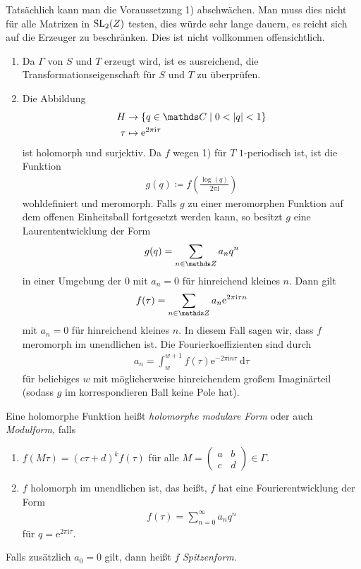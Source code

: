 Tatsächlich kann man die Voraussetzung 1) abschwächen.
Man muss dies nicht für alle Matrizen in $\operatorname{SL}_2(Z)$ testen,
dies würde sehr lange dauern, es reicht sich auf die Erzeuger zu beschränken.
Dies ist nicht vollkommen offensichtlich.
\begin{bem}
\begin{enumerate}[label=\arabic*)]
\item Da $\Gamma$ von $S$ und $T$ erzeugt wird, ist es ausreichend,
die Transformationseigenschaft für $S$ und $T$ zu überprüfen.
\item Die Abbildung
\begin{align*}
H&\to \{q \in \C \mid 0<\abs{q}<1\}\\
\tau &\mapsto \mathrm{e}^{2 \pi \mathrm{i}\tau}
\end{align*}
ist holomorph und surjektiv.
Da $f$ wegen 1) für $T$ $1$-periodisch ist, ist die Funktion
\begin{align*}
g(q)\coloneqq f\left( \frac{\log(q)}{2 \pi \mathrm{i}} \right)
\end{align*}
wohldefiniert und meromorph.
Falls $g$ zu einer meromorphen Funktion auf dem offenen Einheitsball fortgesetzt werden kann,
so besitzt $g$ eine Laurententwicklung der Form
\begin{align*}
g(q)=\sum_{n\in \Z} a_nq^n
\end{align*}
in einer Umgebung der $0$ mit $a_n=0$ für hinreichend kleines $n$. Dann gilt
\begin{align*}
f(\tau)=\sum_{n\in \Z} a_n \mathrm{e}^{2 \pi \mathrm{i} \tau n}
\end{align*}
mit $a_n=0$ für hinreichend kleines $n$.
In diesem Fall sagen wir, dass $f$ meromorph im unendlichen ist.
Die Fourierkoeffizienten sind durch
\begin{align*}
a_n =\int_w^{w+1} f(\tau)\mathrm{e}^{-2\pi \mathrm{i} n \tau}~\mathrm{d}\tau
\end{align*}
für beliebiges $w$ mit möglicherweise hinreichendem großem Imaginärteil (sodass $g$ im korrespondieren Ball keine Pole hat).
\end{enumerate}
\end{bem}

\begin{defi}
Eine holomorphe Funktion heißt \emph{holomorphe modulare Form} oder auch \emph{Modulform}, falls
\begin{enumerate}[label=\arabic*)]
\item $f(M\tau)=(c\tau +d)^k f(\tau)$ für alle $M=\begin{pmatrix}
a&b\\
c&d
\end{pmatrix} \in \Gamma$.
\item $f$ holomorph im unendlichen ist, das heißt, $f$ hat eine Fourierentwicklung der Form
\begin{align*}
f(\tau)=\sum_{n=0}^\infty a_n q^n
\end{align*}
für $q=\mathrm{e}^{2\pi \mathrm{i} \tau}$.
\end{enumerate}
Falls zusätzlich $a_0=0$ gilt, dann heißt $f$ \emph{Spitzenform}.
\end{defi}

